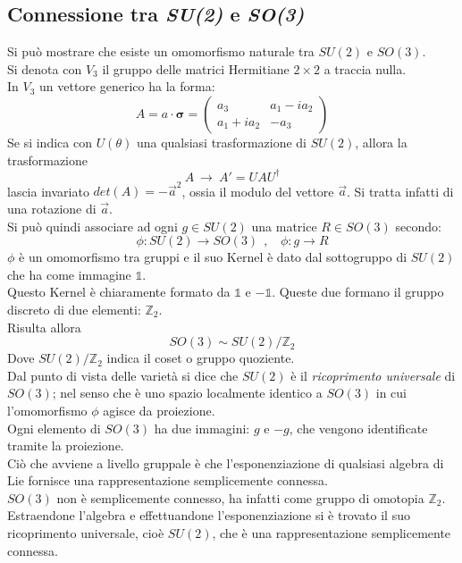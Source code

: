 \documentclass[twoside]{article}
\begin{document}
\vspace{0.5cm}
\subsection{Connessione tra \textit{SU(2)} e \textit{SO(3)}}

Si può mostrare che esiste un omomorfismo naturale tra $SU(2)$ e $SO(3)$.
\\
Si denota con $V_3$ il gruppo delle matrici Hermitiane $2\times 2$ a traccia nulla.
\\
In $V_3$ un vettore generico ha la forma:
\begin{equation}
    A=a\cdot\bm{\sigma}=\begin{pmatrix}
    a_3 & a_1-ia_2 \\ a_1+ia_2 & -a_3
    \end{pmatrix}
\end{equation}
Se si indica con $U(\theta)$ una qualsiasi trasformazione di $SU(2)$, allora la trasformazione
\begin{equation}
    A\ \to \ A'=UAU^{\dagger}
\end{equation}
lascia invariato $det(A)=-\Vec{a}^2$, ossia il modulo del vettore $\Vec{a}$. Si tratta infatti di una rotazione di $\Vec{a}$.
\\
Si può quindi associare ad ogni $g\in SU(2)$ una matrice $R\in SO(3)$ secondo:
\begin{equation}
    \phi:SU(2) \to SO(3) \ \ , \ \ \ \ \phi:g\to R
\end{equation}
$\phi$ è un omomorfismo tra gruppi e il suo Kernel è dato dal sottogruppo di $SU(2)$ che ha come immagine $\mathds{1}$.
\\
Questo Kernel è chiaramente formato da $\mathds{1}$ e $-\mathds{1}$.
Queste due formano il gruppo discreto di due elementi: $\mathds{Z}_2$.
\\
Risulta allora 
\begin{equation}
    SO(3)\sim SU(2)/\mathds{Z}_2
\end{equation}
Dove $SU(2)/\mathds{Z}_2$ indica il coset o gruppo quoziente.
\\
Dal punto di vista delle varietà si dice che $SU(2)$ è il \textit{ricoprimento universale} di $SO(3)$; nel senso che è uno spazio localmente identico a $SO(3)$ in cui l'omomorfismo $\phi$ agisce da proiezione.
\\
Ogni elemento di $SO(3)$ ha due immagini: $g$ e $-g$, che vengono identificate tramite la proiezione.
\\
Ciò che avviene a livello gruppale è che l'esponenziazione di qualsiasi algebra di Lie fornisce una rappresentazione semplicemente connessa.
\\
$SO(3)$ non è semplicemente connesso, ha infatti come gruppo di omotopia $\mathds{Z}_2$.
\\
Estraendone l'algebra e effettuandone l'esponenziazione si è trovato il suo ricoprimento universale, cioè $SU(2)$, che è una rappresentazione semplicemente connessa.
\end{document}
